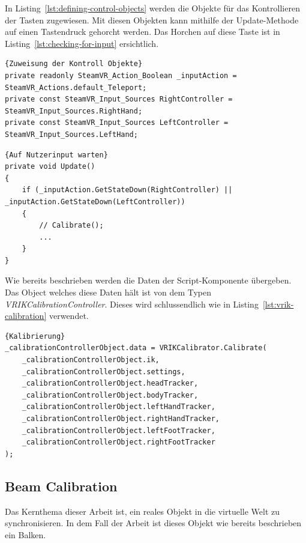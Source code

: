 In Listing~\ref{lst:defining-control-objects} werden die Objekte für das Kontrollieren der Tasten zugewiesen.
Mit diesen Objekten kann mithilfe der Update-Methode auf einen Tastendruck gehorcht werden.
Das Horchen auf diese Taste ist in Listing~\ref{lst:checking-for-input} ersichtlich.

\begin{lstlisting}[language={[Sharp]C},label={lst:defining-control-objects}, caption={Zuweisung der Kontroll Objekt}]{Zuweisung der Kontroll Objekte}
private readonly SteamVR_Action_Boolean _inputAction = SteamVR_Actions.default_Teleport;
private const SteamVR_Input_Sources RightController = SteamVR_Input_Sources.RightHand;
private const SteamVR_Input_Sources LeftController = SteamVR_Input_Sources.LeftHand;
\end{lstlisting}

\begin{lstlisting}[language={[Sharp]C},label={lst:checking-for-input}, caption={Auf Nutzerinput warten}]{Auf Nutzerinput warten}
private void Update()
{
    if (_inputAction.GetStateDown(RightController) || _inputAction.GetStateDown(LeftController))
    {
        // Calibrate();
        ...
    }
}
\end{lstlisting}

Wie bereits beschrieben werden die Daten der Script-Komponente übergeben.
Das Object welches diese Daten hält ist von dem Typen \emph{VRIKCalibrationController}.
Dieses wird schlussendlich wie in Listing~\ref{lst:vrik-calibration} verwendet.

\begin{lstlisting}[language={[Sharp]C},label={lst:vrik-calibration}, caption={Kalibrierung}]{Kalibrierung}
_calibrationControllerObject.data = VRIKCalibrator.Calibrate(
    _calibrationControllerObject.ik,
    _calibrationControllerObject.settings,
    _calibrationControllerObject.headTracker,
    _calibrationControllerObject.bodyTracker,
    _calibrationControllerObject.leftHandTracker,
    _calibrationControllerObject.rightHandTracker,
    _calibrationControllerObject.leftFootTracker,
    _calibrationControllerObject.rightFootTracker
);
\end{lstlisting}


\subsection{Beam Calibration}
\label{subsec:beam-calibration}

Das Kernthema dieser Arbeit ist, ein reales Objekt in die virtuelle Welt zu synchronisieren.
In dem Fall der Arbeit ist dieses Objekt wie bereits beschrieben ein Balken.

